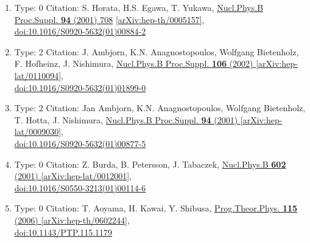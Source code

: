 \documentclass[a4paper,10pt]{article}
\begin{document}
\begin{enumerate}
\begin{enumerate}
  \item Type: 0 Citation: S. Horata, H.S. Egawa, T. Yukawa, \href{https://www.doi.org/10.1016/S0920-5632(01)00884-2}{Nucl.Phys.B Proc.Suppl. {\bf 94} (2001) 708}  \href{https://arxiv.org/abs/hep-th/0005157}{[arXiv:hep-th/0005157]},\\\href{https://www.doi.org/10.1016/S0920-5632(01)00884-2}{doi:10.1016/S0920-5632(01)00884-2}
  \item Type: 2 Citation: J. Ambjorn, K.N. Anagnostopoulos, Wolfgang Bietenholz, F. Hofheinz, J. Nishimura, \href{https://www.doi.org/10.1016/S0920-5632(01)01899-0}{Nucl.Phys.B Proc.Suppl. {\bf 106} (2002) }  \href{https://arxiv.org/abs/hep-lat/0110094}{[arXiv:hep-lat/0110094]},\\\href{https://www.doi.org/10.1016/S0920-5632(01)01899-0}{doi:10.1016/S0920-5632(01)01899-0}
  \item Type: 2 Citation: Jan Ambjorn, K.N. Anagnostopoulos, Wolfgang Bietenholz, T. Hotta, J. Nishimura, \href{https://www.doi.org/10.1016/S0920-5632(01)00877-5}{Nucl.Phys.B Proc.Suppl. {\bf 94} (2001) }  \href{https://arxiv.org/abs/hep-lat/0009030}{[arXiv:hep-lat/0009030]},\\\href{https://www.doi.org/10.1016/S0920-5632(01)00877-5}{doi:10.1016/S0920-5632(01)00877-5}
  \item Type: 0 Citation: Z. Burda, B. Petersson, J. Tabaczek, \href{https://www.doi.org/10.1016/S0550-3213(01)00114-6}{Nucl.Phys.B {\bf 602} (2001) }  \href{https://arxiv.org/abs/hep-lat/0012001}{[arXiv:hep-lat/0012001]},\\\href{https://www.doi.org/10.1016/S0550-3213(01)00114-6}{doi:10.1016/S0550-3213(01)00114-6}
  \item Type: 0 Citation: T. Aoyama, H. Kawai, Y. Shibusa, \href{https://www.doi.org/10.1143/PTP.115.1179}{Prog.Theor.Phys. {\bf 115} (2006) }  \href{https://arxiv.org/abs/hep-th/0602244}{[arXiv:hep-th/0602244]},\\\href{https://www.doi.org/10.1143/PTP.115.1179}{doi:10.1143/PTP.115.1179}

\end{enumerate}
\end{enumerate}
\end{document}
